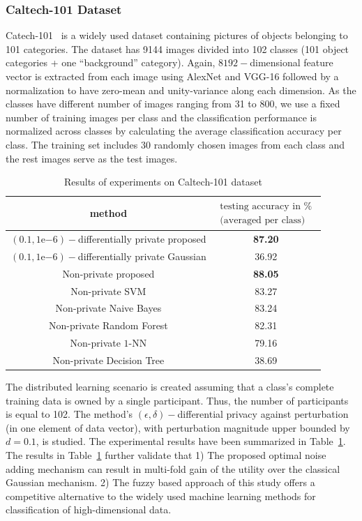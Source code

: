 \subsubsection{Caltech-101 Dataset}
Catech-101~\cite{1384978} is a widely used dataset containing pictures of objects belonging to 101 categories. The dataset has 9144 images divided into 102 classes (101 object categories + one ``background'' category). Again, $8192-$dimensional feature vector is extracted from each image using AlexNet and VGG-16 followed by a normalization to have zero-mean and unity-variance along each dimension. As the classes have different number of images ranging from 31 to 800, we use a fixed number of training images per class and the classification performance is normalized across classes by calculating the average classification accuracy per class. The training set includes 30 randomly chosen images from each class and the rest images serve as the test images.
\begin{table}
\renewcommand{\arraystretch}{1.3}
\caption{Results of experiments on Caltech-101 dataset}
\label{table_results_caltech101} \centering
\begin{tabular}{c||c}
\hline
\bfseries method  & \bfseries $\begin{array}{c} \mbox{testing accuracy in \%} \\ \mbox{(averaged per class)} \end{array}$   \\
\hline \hline  
$(0.1,1\mathrm{e}{-6})-$differentially private proposed & \textbf{87.20} \\
$(0.1,1\mathrm{e}{-6})-$differentially private Gaussian & 36.92 \\
Non-private proposed & \textbf{88.05}   \\
Non-private SVM &    83.27      \\
Non-private Naive Bayes &  83.24    \\
Non-private Random Forest &  82.31    \\
Non-private $1$-NN & 79.16    \\
Non-private Decision Tree &  38.69  \\
\hline \hline
\end{tabular}
\end{table}        

The distributed learning scenario is created assuming that a class's complete training data is owned by a single participant. Thus, the number of participants is equal to 102. The method's $(\epsilon,\delta)-$differential privacy against perturbation (in one element of data vector), with perturbation magnitude upper bounded by $d = 0.1$, is studied. The experimental results have been summarized in Table~\ref{table_results_caltech101}. The results in Table~\ref{table_results_caltech101} further validate that    
1) The proposed optimal noise adding mechanism can result in multi-fold gain of the utility over the classical Gaussian mechanism. 2) The fuzzy based approach of this study offers a competitive alternative to the widely used machine learning methods for classification of high-dimensional data.

